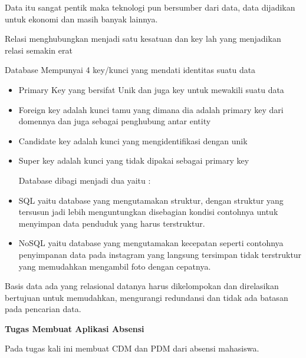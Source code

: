 \documentclass[12pt]{article}
\begin{document}
Data itu sangat pentik maka teknologi pun bersumber dari data, data dijadikan untuk ekonomi dan masih banyak lainnya.

Relasi menghubungkan menjadi satu kesatuan dan key lah yang menjadikan relasi semakin erat

Database Mempunyai 4 key/kunci yang mendati identitas suatu data 
\begin{itemize}
  \item Primary Key yang bersifat Unik dan juga key untuk mewakili suatu data
  \item Foreign key adalah kunci tamu yang dimana dia adalah primary key dari domennya dan juga sebagai penghubung antar entity
  \item Candidate key adalah kunci yang mengidentifikasi dengan unik
  \item Super key adalah kunci yang tidak dipakai sebagai primary key
        \hspace*{3cm}
        
        Database dibagi menjadi dua yaitu :
        \item SQL yaitu database yang mengutamakan struktur, dengan struktur yang tersusun jadi lebih menguntungkan disebagian kondisi contohnya untuk menyimpan data penduduk yang harus terstruktur.
        \item NoSQL yaitu database yang mengutamakan kecepatan seperti contohnya penyimpanan data pada instagram yang langsung tersimpan tidak terstruktur yang memudahkan mengambil foto dengan cepatnya.
\end{itemize}

Basis data ada yang relasional datanya harus dikelompokan dan direlasikan bertujuan untuk memudahkan, mengurangi redundansi dan tidak ada batasan pada pencarian data.

\vspace{5cm}
\textbf{Tugas Membuat Aplikasi Absensi}

\vspace{1cm}
Pada tugas kali ini membuat CDM dan PDM dari absensi mahasiswa. 
\end{document}
